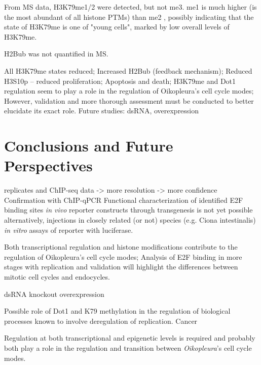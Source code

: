 \documentclass[11pt,twoside,a4paper]{report}
\begin{document}
From MS data, H3K79me1/2 were detected, but not me3. me1 is much higher (is the most abundant of all histone PTMs) than me2 \cite{Moosmann2011}, possibly indicating that the state of H3K79me is one of "young cells", marked by low overall levels of H3K79me.

H2Bub was not quantified in MS.



All H3K79me states reduced;
Increased H2Bub (feedback mechanism);
Reduced H3S10p – reduced proliferation;
Apoptosis and death;
H3K79me and Dot1 regulation seem to play a role in the
regulation of Oikopleura's cell cycle modes;
However, validation and more thorough assessment must be
conducted to better elucidate its exact role.
Future studies: dsRNA, overexpression

\clearpage

\chapter{Conclusions and Future Perspectives}




replicates and ChIP-seq data -> more resolution -> more confidence 
Confirmation with ChIP-qPCR
Functional characterization of identified E2F binding sites 
\textit{in vivo} reporter constructs through transgenesis is not yet possible
alternatively,
injections in closely related (or not) species (e.g. Ciona intestinalis)
\textit{in vitro} assays of reporter with luciferase.


Both transcriptional regulation and histone modifications contribute to the regulation of Oikopleura's cell cycle modes;
Analysis of E2F binding in more stages with replication and validation will highlight the differences between mitotic cell cycles and endocycles.


dsRNA knockout
overexpression

Possible role of Dot1 and K79 methylation in the regulation of biological processes known to involve deregulation of replication. Cancer




Regulation at both transcriptional and epigenetic levels is required and probably both play a role in the regulation and transition between \textit{Oikopleura}'s cell cycle modes.



\cleardoublepage
%
%


\end{document}
